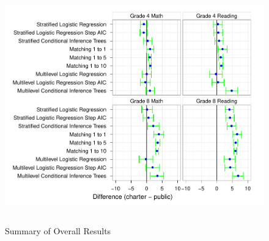 \documentclass[letterpaper,12pt]{article}
\begin{document}
\begin{figure}[t]
\begin{center}
\includegraphics[height=4in]{../Figures/overallsummary.pdf}
\caption{Summary of Overall Results}
\label{fig:overallresults}
\end{center}
\end{figure}




\cleardoublepage



\newpage

\cleardoublepage
{}
\appendix

\renewcommand{\thefootnote}{\fnsymbol{footnote}}%
\end{document}
